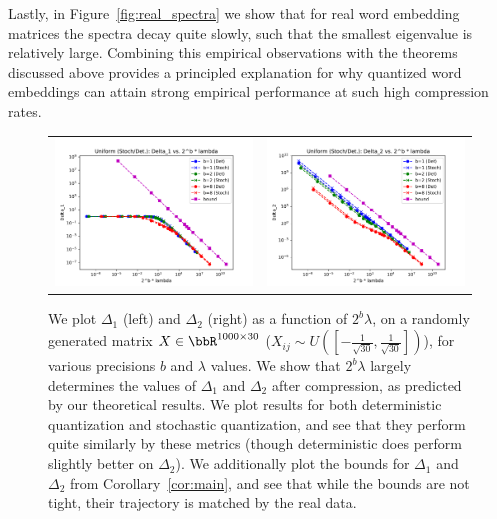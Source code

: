 Lastly, in Figure~\ref{fig:real_spectra} we show that for real word embedding matrices the spectra decay quite slowly, such that the smallest eigenvalue is relatively large.
Combining this empirical observations with the theorems discussed above provides a principled explanation for why quantized word embeddings can attain strong empirical performance at such high compression rates.

\begin{figure}
	\centering
	\begin{tabular}{c c}
		\includegraphics[width=0.4\linewidth]{figures/micro_uniform_nonadapt_delta1_vs_2_b_lambda.pdf} &	
		\includegraphics[width=0.4\linewidth]{figures/micro_uniform_nonadapt_delta2_vs_2_b_lambda.pdf}
	\end{tabular}
	\caption{We plot $\Delta_1$ (left) and $\Delta_2$ (right) as a function of $2^b\lambda$, on a randomly generated matrix $X\in\RR^{1000\times 30}$ ($X_{ij}\sim U([-\frac{1}{\sqrt{30}},\frac{1}{\sqrt{30}}])$), for various precisions $b$ and $\lambda$ values.  We show that $2^b \lambda$ largely determines the values of $\Delta_1$ and $\Delta_2$ after compression, as predicted by our theoretical results. We plot results for both deterministic quantization and stochastic quantization, and see that they perform quite similarly by these metrics (though deterministic does perform slightly better on $\Delta_2$). We additionally plot the bounds for $\Delta_1$ and $\Delta_2$ from Corollary~\ref{cor:main}, and see that while the bounds are not tight, their trajectory is matched by the real data.}
	\label{fig:micro_d1d2}
\end{figure}

